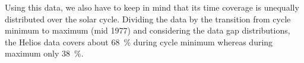 Using this data, we also have to keep in mind that its time coverage is unequally distributed over the solar cycle. Dividing the data by the transition from cycle minimum to maximum (mid 1977) and considering the data gap distributions, the Helios data covers about \SI{68}{\percent} during cycle minimum whereas during maximum only \SI{38}{\percent}.\\

% 

